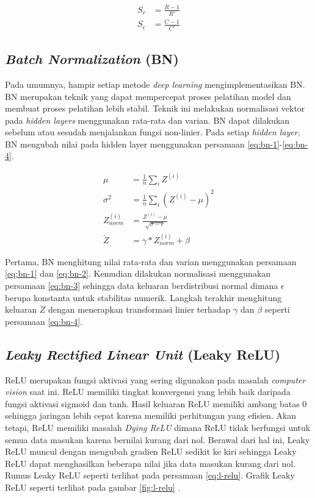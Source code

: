     \begin{align}
        \label{eq:upsample}
        S_r &= \frac{R-1}{R'}\nonumber\\
        S_c &= \frac{C-1}{C'}
    \end{align}

    \subsection{\textit{Batch Normalization} (BN)}
    Pada umumnya, hampir setiap metode \textit{deep learning} mengimplementasikan BN. BN merupakan teknik yang dapat mempercepat proses pelatihan model dan membuat proses pelatihan lebih stabil. Teknik ini melakukan normalisasi vektor pada \textit{hidden layers} menggunakan rata-rata dan varian. BN dapat dilakukan sebelum atau sesudah menjalankan fungsi non-linier. Pada setiap \textit{hidden layer}, BN mengubah nilai pada hidden layer menggunakan persamaan \ref{eq:bn-1}-\ref{eq:bn-4}.

    \begin{align}
        \label{eq:bn-1}
        \mu &= \frac{1}{n} \sum_i Z^{(i)}\\
        \label{eq:bn-2}
        \sigma^2 &= \frac{1}{n} \sum_i (Z^{(i)}-\mu)^2\\
        \label{eq:bn-3}
        Z^{(i)}_{norm} &= \frac{Z^{(i)}-\mu}{\sqrt{\sigma-\epsilon}}\\
        \label{eq:bn-4}
        \breve{Z} &= \gamma \ast Z^{(i)}_{norm}+\beta
    \end{align}

    Pertama, BN menghitung nilai rata-rata dan varian menggunakan persamaan \ref{eq:bn-1} dan \ref{eq:bn-2}. Kemudian dilakukan normalisasi menggunakan persamaan \ref{eq:bn-3} sehingga data keluaran berdistribusi normal dimana $\epsilon$ berupa konstanta untuk stabilitas numerik. Langkah terakhir menghitung keluaran $\breve{Z}$ dengan menerapkan transformasi linier terhadap $\gamma$ dan $\beta$ seperti persamaan \ref{eq:bn-4}.

    \subsection{\textit{Leaky Rectified Linear Unit} (Leaky ReLU)}
    ReLU merupakan fungsi aktivasi yang sering digunakan pada masalah \textit{computer vision} saat ini. ReLU memiliki tingkat konvergensi yang lebih baik daripada fungsi aktivasi sigmoid dan tanh. Hasil keluaran ReLU memiliki ambang batas $0$ sehingga jaringan lebih cepat karena memiliki perhitungan yang efisien. Akan tetapi, ReLU memiliki masalah \textit{Dying ReLU} dimana ReLU tidak berfungsi untuk semua data masukan karena bernilai kurang dari nol. Berawal dari hal ini, Leaky ReLU muncul dengan mengubah gradien ReLU sedikit ke kiri sehingga Leaky ReLU dapat menghasilkan beberapa nilai jika data masukan kurang dari nol. Rumus Leaky ReLU seperti terlihat pada persamaan \ref{eq:l-relu}. Grafik Leaky ReLU seperti terlihat pada gambar \ref{fig:l-relu} \citep{Xu2015}.

